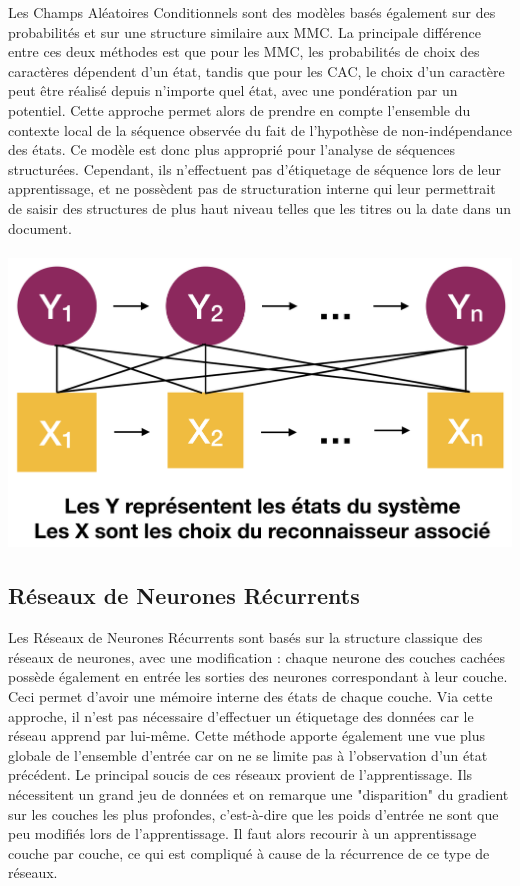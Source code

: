 Les Champs Aléatoires Conditionnels sont des modèles basés également sur des probabilités et
sur une structure similaire aux MMC. La principale différence entre ces deux méthodes est que pour les MMC,
les probabilités de choix des caractères dépendent d'un état, tandis que pour les CAC, le choix d'un
caractère peut être réalisé depuis n'importe quel état, avec une pondération par un potentiel.
Cette approche permet alors de prendre en compte l'ensemble du contexte local de la séquence observée
du fait de l'hypothèse de non-indépendance des états. Ce modèle est donc plus approprié pour l'analyse de
séquences structurées. Cependant, ils n'effectuent pas d'étiquetage de séquence lors de leur apprentissage,
et ne possèdent pas de structuration interne qui leur permettrait de saisir des structures de plus haut
niveau telles que les titres ou la date dans un document.

\paragraph{}
\begin{mdframed}[frametitle={Schéma de transition et d'observation d'un CAC}, innerbottommargin=10]
\begin{center}
\includegraphics[width=0.6\linewidth]{cac.png}
\end{center}
\end{mdframed}

\subsection{Réseaux de Neurones Récurrents}

Les Réseaux de Neurones Récurrents sont basés sur la structure classique des réseaux de neurones,
avec une modification : chaque neurone des couches cachées possède également en entrée les sorties
des neurones correspondant à leur couche. Ceci permet d'avoir une mémoire interne des états de chaque couche.
Via cette approche, il n'est pas nécessaire d'effectuer un étiquetage des données car le réseau apprend
par lui-même. Cette méthode apporte également une vue plus globale de l'ensemble d'entrée car on ne se limite
pas à l'observation d'un état précédent. Le principal soucis de ces réseaux provient de l'apprentissage.
Ils nécessitent un grand jeu de données et on remarque une "disparition" du gradient sur les couches les plus
profondes, c'est-à-dire que les poids d'entrée ne sont que peu modifiés lors de l'apprentissage. Il faut alors
recourir à un apprentissage couche par couche, ce qui est compliqué à cause de la récurrence de ce type de réseaux.

